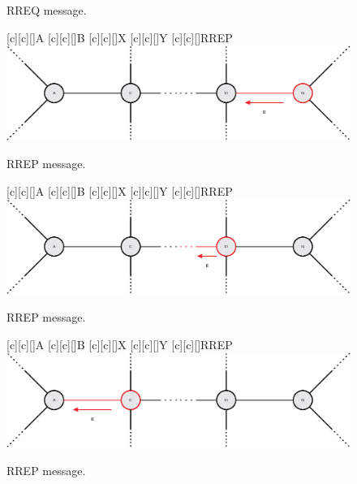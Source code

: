 \documentclass[mathserif]{beamer}
\begin{document}
\begin{frame}
\begin{overprint}
{\begin{figure}[ht]
				\caption{RREQ message.}
			\end{figure}
		}
		{
			\begin{figure}[ht]
				[c][c][\sizeLetter]{A}
				[c][c][\sizeLetter]{B}
				[c][c][\sizeLetter]{X}
				[c][c][\sizeLetter]{Y}
				[c][c][\sizeLetter]{\alert{RREP}}
				\centering
				\includegraphics[width=\linewidth]{figuras/routing4}
				\caption{RREP message.}
			\end{figure}
		}
		{
			\begin{figure}[ht]
				[c][c][\sizeLetter]{A}
				[c][c][\sizeLetter]{B}
				[c][c][\sizeLetter]{X}
				[c][c][\sizeLetter]{Y}
				[c][c][\sizeLetter]{\alert{RREP}}
				\centering
				\includegraphics[width=\linewidth]{figuras/routing5}
				\caption{RREP message.}
			\end{figure}
		}
		{
			\begin{figure}[ht]
				[c][c][\sizeLetter]{A}
				[c][c][\sizeLetter]{B}
				[c][c][\sizeLetter]{X}
				[c][c][\sizeLetter]{Y}
				[c][c][\sizeLetter]{\alert{RREP}}
				\centering
				\includegraphics[width=\linewidth]{figuras/routing6}
				\caption{RREP message.}
			\end{figure}
		}
		{
			\begin{figure}[ht]

\end{figure}}
\end{overprint}
\end{frame}
\end{document}
